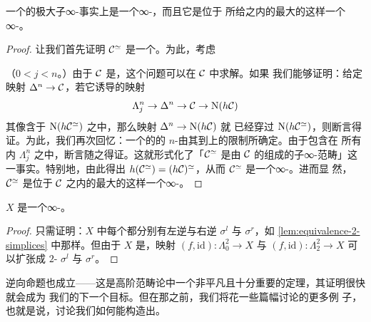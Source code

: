 \begin{corollary}\label{cor:maximal-groupoid-infinity-groupoid}
一个\trInfinityCategory{}的极大子∞-\trGroupoid{}事实上是一个∞-\trGroupoid{}，而且它是位于
所给\trInfinityCategory{}之内的最大的这样一个∞-\trGroupoid{}。
\end{corollary}

\begin{proof}
让我们首先证明 $\mathcal{C}^{\simeq}$ 是一个\trInfinityCategory{}。为此，考虑\trLiftingProblem{}%
\begin{center}
\end{center}
（$0 < j < n$。）由于 $\mathcal{C}$ 是\trInfinityCategory{}，这个问题可以在 $\mathcal{C}$ 中求解。如果
我们能够证明：给定映射 $\Delta^n \to \mathcal{C}$，若它诱导的映射
\[
\Lambda^n_j \to \Delta^n \to \mathcal{C} \to \mathrm{N}(h\mathcal{C})
\]
其像含于 $\mathrm{N}(h\mathcal{C}^{\simeq})$ 之中，那么映射 $\Delta^n \to \mathrm{N}(h\mathcal{C})$ 就
已经穿过 $\mathrm{N}(h\mathcal{C}^{\simeq})$，则断言得证。为此，我们再次回忆：一个\trCategory{}的\trNerve{}的 $n$-\trSimplex{}由其到\trSpine{}上的限制所确定。由于\trSpine{}包含在
所有内\trHorn{} $\Lambda^n_j$ 之中，断言随之得证。这就形式化了「$\mathcal{C}^{\simeq}$ 是由
$\mathcal{C}$ 的\trEquivalence{}组成的子∞-范畴」这一事实。特别地，由此得出
$h(\mathcal{C}^{\simeq}) = (h\mathcal{C})^{\simeq}$，从而 $\mathcal{C}^{\simeq}$ 是一个∞-\trGroupoid{}。进而显
然，$\mathcal{C}^{\simeq}$ 是位于 $\mathcal{C}$ 之内的最大的这样一个∞-\trGroupoid{}。
\end{proof}

\begin{lemma}\label{lem:kan-complex-infinity-groupoid}
\trKanComplex{} $X$ 是一个∞-\trGroupoid{}。
\end{lemma}

\begin{proof}
只需证明：$X$ 中每个\trMorphism{}都分别有左逆与右逆 $\sigma^l$ 与 $\sigma^r$，如%
\cref{lem:equivalence-2-simplices} 中那样。但由于 $X$ 是\trKanComplex{}，映射
$(f, \mathrm{id})\colon \Lambda^2_0 \to X$ 与
$(f, \mathrm{id})\colon \Lambda^2_2 \to X$ 可以扩张成 $2$-\trSimplex{} $\sigma^l$ 与
$\sigma^r$。
\end{proof}

逆向命题也成立——这是高阶范畴论中一个非平凡且十分重要的定理，其证明很快就会成为
我们的下一个目标。但在那之前，我们将花一些篇幅讨论\trInfinityCategories{}的更多例
子，也就是说，讨论我们如何能构造出\trInfinityCategories{}。

